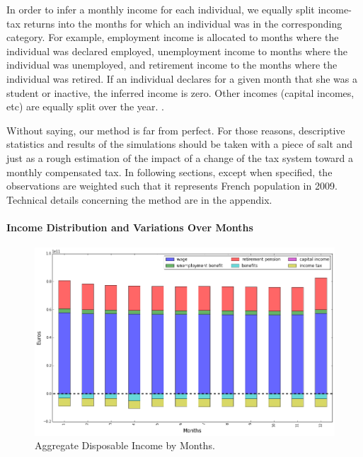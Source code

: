 In order to infer a monthly income for each individual, we equally split
income-tax returns into the months for which an individual was in the
corresponding category. For example, employment income is allocated to months
where the individual was declared employed, unemployment income to months
where the individual was unemployed, and retirement income to the months where
the individual was retired. If an individual declares for a given month that
she was a student or inactive, the inferred income is zero. Other incomes
(capital incomes, etc) are equally split over the year. .

Without saying, our method is far from perfect. For those reasons, descriptive
statistics and results of the simulations should be taken with a piece of salt
and just as a rough estimation of the impact of a change of the tax system
toward a monthly compensated tax. In following sections, except when
specified, the observations are weighted such that it represents French
population in 2009. Technical details concerning the method are in the appendix.

\paragraph{Income Distribution and Variations Over Months}

\begin{figure}[ptb]
\caption{Aggregate Disposable Income by Months.}
\label{fig:aggreagate_income}
\centering
\includegraphics[width=\textwidth]{aggregate_income_by_month.png}\end{figure}

